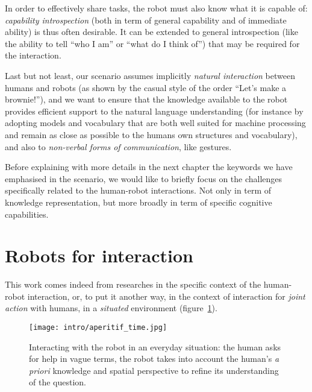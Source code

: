 In order to effectively share tasks, the robot must also know what it is
capable of: \emph{capability introspection} (both in term of general capability
and of immediate ability) is thus often desirable. It can be extended to
general introspection (like the ability to tell ``who I am'' or ``what do I
think of'') that may be required for the interaction.

Last but not least, our scenario assumes implicitly \emph{natural interaction}
between humans and robots (as shown by the casual style of the order ``Let's
make a brownie!''), and we want to ensure that the
knowledge available to the robot provides efficient support to the natural
language understanding (for instance by adopting models and vocabulary that are
both well suited for machine processing and remain as close as possible to the
humans own structures and vocabulary), and also to \emph{non-verbal forms of
communication}, like gestures.

Before explaining with more details in the next chapter the keywords we have
emphasised in the scenario, we would like to briefly focus on the challenges
specifically related to the human-robot interactions. Not only in term of
knowledge representation, but more broadly in term of specific cognitive
capabilities.


\section{Robots for interaction}
\label{sect|hri-context}

This work comes indeed from researches in the specific context of the
human-robot interaction, or, to put it another way, in the context of
interaction for \emph{joint action} with humans,  in a \emph{situated}
environment (figure~\ref{fig|aperitif}).

\begin{figure}%
    \centering
    \texttt{[image: intro/aperitif\_time.jpg]} 

    \caption{Interacting with the robot in an everyday situation: the human
    asks for help in vague terms, the robot takes into account the human's {\it
    a priori} knowledge and spatial perspective to refine its understanding of
    the question.} 

    \label{fig|aperitif} 
\end{figure}

